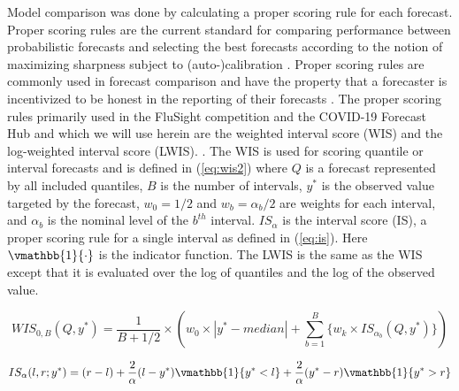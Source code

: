 Model comparison was done by calculating a proper scoring rule for each 
forecast.
Proper scoring rules are the 
current standard for comparing performance between probabilistic forecasts 
and selecting the best forecasts according to the notion of maximizing 
sharpness subject to (auto-)calibration 
\cite[]{gneiting2007probabilistic, tsyplakov2013evaluation}. Proper scoring 
rules are commonly used in forecast comparison and have the property that a 
forecaster is incentivized to be honest in the reporting of their forecasts 
\cite[]{gneiting2007strictly, gneiting2014probabilistic}.
The proper scoring rules primarily used in the FluSight competition and the 
COVID-19 Forecast Hub and which we will use herein are the 
weighted interval score (WIS) and the log-weighted interval score (LWIS).
\cite[]{mathis2024evaluation, bracher2021evaluating}.
The WIS is used for scoring quantile or interval 
forecasts 
\cite[]{gneiting2007strictly, gneiting2014probabilistic, bracher2021evaluating} 
and is defined in (\ref{eq:wis2}) where $Q$ is a forecast represented by all 
included quantiles, $B$ is the number of intervals,  $y^*$ is the observed 
value targeted by the forecast, $w_0 = 1/2$ and $w_b = \alpha_b / 2$ are 
weights for each interval, and $\alpha_b$ is the nominal level of the $b^{th}$ 
interval. $IS_{\alpha}$ is the interval score (IS), a proper scoring rule for a 
single interval as defined in (\ref{eq:is}). Here 
$\vmathbb{1}\{\cdot\}$ is the indicator function.
The LWIS is the same as the WIS except that it is evaluated 
over the log of quantiles and the log of the observed value.

\begin{equation}
\label{eq:wis2}
        WIS_{0,B}(Q, y^*) = \frac{1}{B + 1/2} \times (w_0\times |y^* - median| + \sum_{b=1}^B \{w_k \times IS_{\alpha_b}(Q, y^*) \} )
\end{equation}

\begin{equation}
\label{eq:is}
        IS_{\alpha}(l,r;y^*) = (r-l) + \frac{2}{\alpha}(l - y^*)\vmathbb{1}\{y^* < l\} + \frac{2}{\alpha}(y^* - r) \vmathbb{1}\{y^* > r\}
\end{equation}


% 



